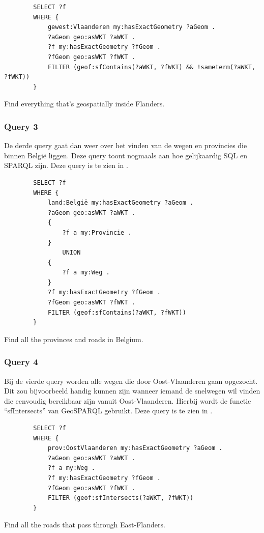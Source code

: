 \begin{listing}[ht]
    \begin{verbatim}
        SELECT ?f
        WHERE {
            gewest:Vlaanderen my:hasExactGeometry ?aGeom .
            ?aGeom geo:asWKT ?aWKT .
            ?f my:hasExactGeometry ?fGeom .
            ?fGeom geo:asWKT ?fWKT .
            FILTER (geof:sfContains(?aWKT, ?fWKT) && !sameterm(?aWKT, ?fWKT))
        }
    \end{verbatim}
    \caption{Find everything that's geospatially inside Flanders.}
    \label{listing:find_everything_flanders}
\end{listing}


\subsubsection{Query 3}
De derde query gaat dan weer over het vinden van de wegen en provincies die binnen België liggen. Deze query toont nogmaals aan hoe gelijkaardig SQL en SPARQL zijn. Deze query is te zien in .

\begin{listing}[ht]
    \begin{verbatim}
        SELECT ?f
        WHERE {
            land:België my:hasExactGeometry ?aGeom .
            ?aGeom geo:asWKT ?aWKT .
            {
                ?f a my:Provincie .
            }
                UNION
            {
                ?f a my:Weg .
            }
            ?f my:hasExactGeometry ?fGeom .
            ?fGeom geo:asWKT ?fWKT .
            FILTER (geof:sfContains(?aWKT, ?fWKT))
        }
    \end{verbatim}
    \caption{Find all the provinces and roads in Belgium.}
    \label{listing:find_provinces_roads_belgium}
\end{listing}


\subsubsection{Query 4}
Bij de vierde query worden alle wegen die door Oost-Vlaanderen gaan opgezocht. Dit zou bijvoorbeeld handig kunnen zijn wanneer iemand de snelwegen wil vinden die eenvoudig bereikbaar zijn vanuit Oost-Vlaanderen. Hierbij wordt de functie ``sfIntersects'' van GeoSPARQL gebruikt. Deze query is te zien in .

\begin{listing}[ht]
    \begin{verbatim}
        SELECT ?f
        WHERE {
            prov:OostVlaanderen my:hasExactGeometry ?aGeom .
            ?aGeom geo:asWKT ?aWKT .
            ?f a my:Weg .
            ?f my:hasExactGeometry ?fGeom .
            ?fGeom geo:asWKT ?fWKT .
            FILTER (geof:sfIntersects(?aWKT, ?fWKT))
        }
    \end{verbatim}
    \caption{Find all the roads that pass through East-Flanders.}
    \label{listing:find_roads_passing_east_flanders}
\end{listing}


